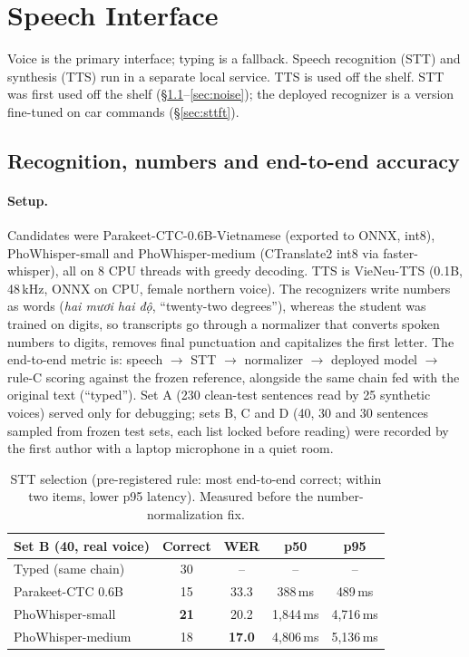 \section{Speech Interface}
\label{sec:speech}

Voice is the primary interface; typing is a fallback. Speech recognition (STT) and synthesis (TTS) run in a separate local
service. TTS is used off the shelf. STT was first used off the shelf (\S\ref{sec:stt}--\ref{sec:noise}); the deployed
recognizer is a version fine-tuned on car commands (\S\ref{sec:sttft}).

\subsection{Recognition, numbers and end-to-end accuracy}
\label{sec:stt}

\paragraph{Setup.} Candidates were Parakeet-CTC-0.6B-Vietnamese \citep{nvidia2026parakeetvi} (exported to ONNX, int8),
PhoWhisper-small and PhoWhisper-medium \citep{le2024phowhisper} (CTranslate2 int8 via faster-whisper), all on 8 CPU threads
with greedy decoding. TTS is VieNeu-TTS \citep{vieneu2026tts} (0.1B, 48\,kHz, ONNX on CPU, female northern voice). The
recognizers write numbers as words (\textit{hai mươi hai độ}, ``twenty-two degrees''), whereas the student was trained on
digits, so transcripts go through a normalizer that converts spoken numbers to digits, removes final punctuation and
capitalizes the first letter. The end-to-end metric is: speech $\rightarrow$ STT $\rightarrow$ normalizer $\rightarrow$
deployed model $\rightarrow$ rule-C scoring against the frozen reference, alongside the same chain fed with the original
text (``typed''). Set A (230 clean-test sentences read by 25 synthetic voices) served only for debugging; sets B, C and D
(40, 30 and 30 sentences sampled from frozen test sets, each list locked before reading) were recorded by the first author with
a laptop microphone in a quiet room.

\begin{table}[t]
\centering\small
\setlength{\tabcolsep}{3.5pt}
\begin{tabular}{@{}lcccc@{}}
\toprule
Set B (40, real voice) & Correct & WER & p50 & p95 \\
\midrule
Typed (same chain) & 30 & -- & -- & -- \\
Parakeet-CTC 0.6B & 15 & 33.3 & 388\,ms & 489\,ms \\
PhoWhisper-small & \textbf{21} & 20.2 & 1,844\,ms & 4,716\,ms \\
PhoWhisper-medium & 18 & \textbf{17.0} & 4,806\,ms & 5,136\,ms \\
\bottomrule
\end{tabular}
\caption{STT selection (pre-registered rule: most end-to-end correct; within two items, lower p95 latency). Measured before
the number-normalization fix.}
\label{tab:stt}
\end{table}

